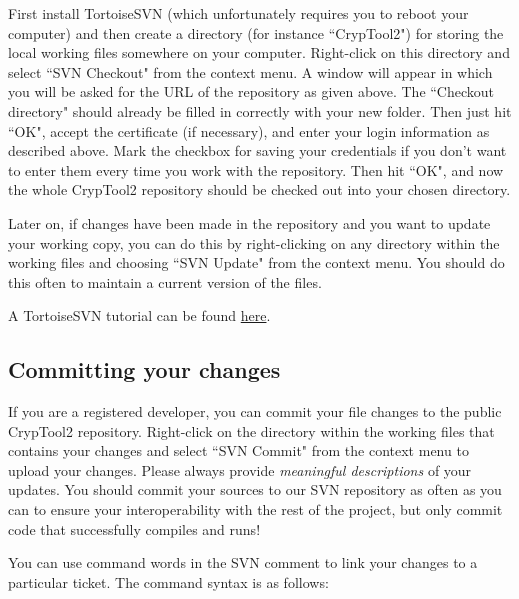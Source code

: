 First install TortoiseSVN (which unfortunately requires you to reboot your computer) and then create a directory (for instance ``CrypTool2") for storing the local working files somewhere on your computer. Right-click on this directory and select ``SVN Checkout" from the context menu. A window will appear in which you will be asked for the URL of the repository as given above. The ``Checkout directory" should already be filled in correctly with your new folder. Then just hit ``OK", accept the certificate (if necessary), and enter your login information as described above. Mark the checkbox for saving your credentials if you don't want to enter them every time you work with the repository. Then hit ``OK", and now the whole CrypTool2 repository should be checked out into your chosen directory.

Later on, if changes have been made in the repository and you want to update your working copy, you can do this by right-clicking on any directory within the working files and choosing ``SVN Update" from the context menu. You should do this often to maintain a current version of the files.

A TortoiseSVN tutorial can be found \href{http://www.mind.ilstu.edu/research/robots/iris4/developers/svntutorial}{here}.

\subsection*{Committing your changes}
\label{CommitingYourChanges}

If you are a registered developer, you can commit your file changes to the public CrypTool2 repository. Right-click on the directory within the working files that contains your changes and select ``SVN Commit" from the context menu to upload your changes. Please always provide \textit{meaningful descriptions} of your updates. You should commit your sources to our SVN repository as often as you can to ensure your interoperability with the rest of the project, but only commit code that successfully compiles and runs!

You can use command words in the SVN comment to link your changes to a particular ticket. The command syntax is as follows:

\begin{center}
\end{center}

